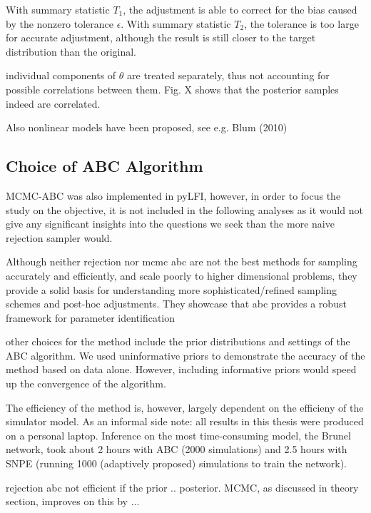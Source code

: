 With summary statistic $T_1$, the adjustment is able to correct for the bias caused by the nonzero tolerance $\epsilon$. With summary statistic $T_2$, the tolerance is too large for accurate adjustment, although the result is still closer to the target distribution than the original.

individual components of $\theta$ are treated separately, thus not accounting for possible correlations between them. Fig. X shows that the posterior samples indeed are correlated.

Also nonlinear models have been proposed, see e.g. Blum (2010)

\subsection{Choice of ABC Algorithm}

MCMC-ABC was also implemented in pyLFI, however, in order to focus the study on the objective, it is not included in the following analyses as it would not give any significant insights into the questions we seek than the more naive rejection sampler would. 

Although neither rejection nor mcmc abc are not the best methods for sampling accurately and efficiently, and scale poorly to higher dimensional problems, they provide a solid basis for understanding more sophisticated/refined sampling schemes and post-hoc adjustments. They showcase that abc provides a robust framework for parameter identification

other choices for the method include the prior distributions and settings of the ABC algorithm. We used uninformative priors to demonstrate the accuracy of the method based on data alone. However, including informative priors would speed up the convergence of the algorithm. 


The efficiency of the method is, however, largely dependent on the efficieny of the simulator model. As an informal side note: all results in this thesis were produced on a personal laptop. Inference on the most time-consuming model, the Brunel network, took about 2 hours with ABC (2000 simulations) and 2.5 hours with SNPE (running 1000 (adaptively proposed) simulations to train the network). 

rejection abc not efficient if the prior .. posterior. MCMC, as discussed in theory section, improves on this by ... 

